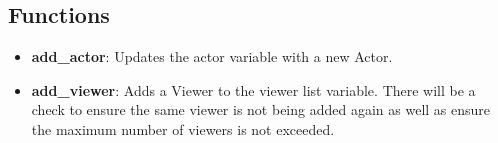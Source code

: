 \documentclass{article}
\begin{document}
\subsection{Functions}
\begin{itemize}

	\item \textbf{add\_actor}: Updates the actor variable with a new Actor.
	
	\item \textbf{add\_viewer}: Adds a Viewer to the viewer list variable. There will be a check to ensure the same viewer is not being added again as well as ensure the maximum number of viewers is not exceeded.
	
\end{itemize}
\end{document}
